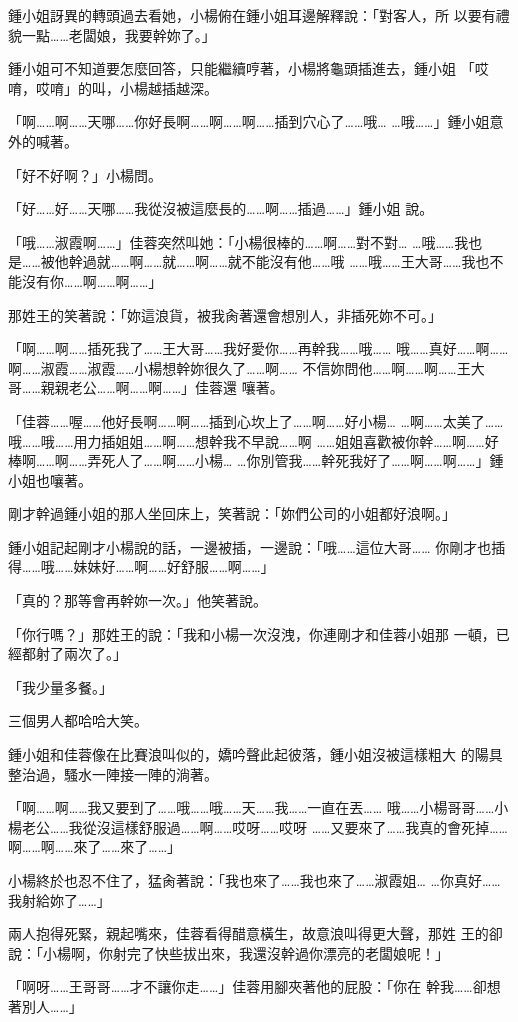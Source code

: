 鍾小姐訝異的轉頭過去看她，小楊俯在鍾小姐耳邊解釋說：「對客人，所
以要有禮貌一點……老闆娘，我要幹妳了。」

鍾小姐可不知道要怎麼回答，只能繼續哼著，小楊將龜頭插進去，鍾小姐
「哎唷，哎唷」的叫，小楊越插越深。

「啊……啊……天哪……你好長啊……啊……啊……插到穴心了……哦…
…哦……」鍾小姐意外的喊著。

「好不好啊？」小楊問。

「好……好……天哪……我從沒被這麼長的……啊……插過……」鍾小姐
說。

「哦……淑霞啊……」佳蓉突然叫她：「小楊很棒的……啊……對不對…
…哦……我也是……被他幹過就……啊……就……啊……就不能沒有他……哦
……哦……王大哥……我也不能沒有你……啊……啊……」

那姓王的笑著說：「妳這浪貨，被我肏著還會想別人，非插死妳不可。」

「啊……啊……插死我了……王大哥……我好愛你……再幹我……哦……
哦……真好……啊……啊……淑霞……淑霞……小楊想幹妳很久了……啊……
不信妳問他……啊……啊……王大哥……親親老公……啊……啊……」佳蓉還
嚷著。

「佳蓉……喔……他好長啊……啊……插到心坎上了……啊……好小楊…
…啊……太美了……哦……哦……用力插姐姐……啊……想幹我不早說……啊
……姐姐喜歡被你幹……啊……好棒啊……啊……弄死人了……啊……小楊…
…你別管我……幹死我好了……啊……啊……」鍾小姐也嚷著。

剛才幹過鍾小姐的那人坐回床上，笑著說：「妳們公司的小姐都好浪啊。」

鍾小姐記起剛才小楊說的話，一邊被插，一邊說：「哦……這位大哥……
你剛才也插得……哦……妹妹好……啊……好舒服……啊……」

「真的？那等會再幹妳一次。」他笑著說。

「你行嗎？」那姓王的說：「我和小楊一次沒洩，你連剛才和佳蓉小姐那
一頓，已經都射了兩次了。」

「我少量多餐。」

三個男人都哈哈大笑。

鍾小姐和佳蓉像在比賽浪叫似的，嬌吟聲此起彼落，鍾小姐沒被這樣粗大
的陽具整治過，騷水一陣接一陣的淌著。

「啊……啊……我又要到了……哦……哦……天……我……一直在丟……
哦……小楊哥哥……小楊老公……我從沒這樣舒服過……啊……哎呀……哎呀
……又要來了……我真的會死掉……啊……啊……來了……來了……」

小楊終於也忍不住了，猛肏著說：「我也來了……我也來了……淑霞姐…
…你真好……我射給妳了……」

兩人抱得死緊，親起嘴來，佳蓉看得醋意橫生，故意浪叫得更大聲，那姓
王的卻說：「小楊啊，你射完了快些拔出來，我還沒幹過你漂亮的老闆娘呢！」

「啊呀……王哥哥……才不讓你走……」佳蓉用腳夾著他的屁股：「你在
幹我……卻想著別人……」

